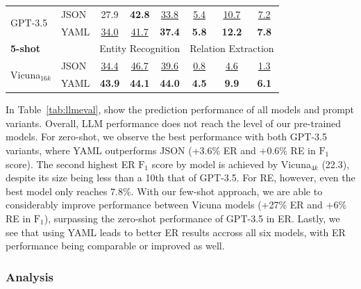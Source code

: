 \begin{table}[tb]
\begin{tabular}{ll|ccc|ccc}
    \multirow{2}{*}{GPT-3.5} &
    JSON & 27.9 & \textbf{42.8} & \underline{33.8}
              & \underline{5.4} & \underline{10.7} & \underline{7.2} \\
    \ & YAML & \underline{34.0} & \underline{41.7} &
    \hphantom{${}_{\Delta\text{+3.6}}$}
    \textbf{37.4}{\color{parametergreen}{${}_{\Delta\text{+3.6}}$}}
              & \textbf{5.8} & \textbf{12.2} &
    \hphantom{${}_{\Delta\text{+0.6}}$}
    \textbf{7.8}{\color{parametergreen}{${}_{\Delta\text{+0.6}}$}}  \\

  \hline
    \multicolumn{2}{l|}{\textbf{5-shot}} &
    \multicolumn{3}{c|}{Entity Recognition} &
    \multicolumn{3}{c}{Relation Extraction} \\
  \hline

    \multirow{2}{*}{Vicuna${}_{16k}$} &
    JSON & \underline{34.4} & \underline{46.7} & \underline{39.6}
              & \underline{0.8} & \underline{4.6} & \underline{1.3} \\
    \ & YAML & \textbf{43.9} & \textbf{44.1} &
    \hphantom{${}_{\Delta\text{+0.4}}$}
    \textbf{44.0}{\color{parametergreen}{${}_{\Delta\text{+0.4}}$}}
              & \textbf{4.5} & \textbf{9.9} &
    \hphantom{${}_{\Delta\text{+4.8}}$}
    \textbf{6.1}{\color{parametergreen}{${}_{\Delta\text{+4.8}}$}}  \\
  \hline
  \end{tabular}
\end{table}

In Table~\ref{tab:llmeval}, show the prediction performance of all models and prompt variants. Overall, LLM performance does not reach the level of our pre-trained models. For zero-shot, we observe the best performance with both GPT-3.5 variants, where YAML outperforms JSON (+3.6\% ER and +0.6\% RE in $\text{F}_1$ score). The second highest ER $\text{F}_1$ score by model is achieved by Vicuna${}_{4k}$ (22.3), despite its size being less than a 10th that of GPT-3.5. For RE, however, even the best model only reaches 7.8\%. With our few-shot approach, we are able to considerably improve performance between Vicuna models (+27\% ER and +6\% RE in $\text{F}_1$), surpassing the zero-shot performance of GPT-3.5 in ER.
Lastly, we see that using YAML leads to better ER results accross all six models, with ER performance being comparable or improved as well.

\subsubsection{Analysis}

